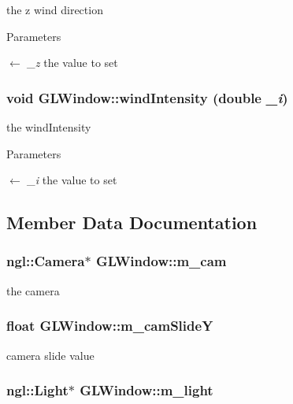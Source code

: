 the z wind direction 
\begin{DoxyParams}{Parameters}
\item[\mbox{$\leftarrow$} {\em \_\-z}]the value to set \end{DoxyParams}
\hypertarget{classGLWindow_a6863e8f482390cdef48a9eaceb7d9bd3}{
\subsubsection[{windIntensity}]{\setlength{\rightskip}{0pt plus 5cm}void GLWindow::windIntensity (double {\em \_\-i})}}
\label{classGLWindow_a6863e8f482390cdef48a9eaceb7d9bd3}


the windIntensity 
\begin{DoxyParams}{Parameters}
\item[\mbox{$\leftarrow$} {\em \_\-i}]the value to set \end{DoxyParams}


\subsection{Member Data Documentation}
\hypertarget{classGLWindow_a55556dafb4fc86c35b270ca0d68f456e}{
\subsubsection[{m\_\-cam}]{\setlength{\rightskip}{0pt plus 5cm}ngl::Camera$\ast$ {\bf GLWindow::m\_\-cam}}}
\label{classGLWindow_a55556dafb4fc86c35b270ca0d68f456e}


the camera \hypertarget{classGLWindow_a74663d07ad7560d68159c76ce5b750b1}{
\subsubsection[{m\_\-camSlideY}]{\setlength{\rightskip}{0pt plus 5cm}float {\bf GLWindow::m\_\-camSlideY}}}
\label{classGLWindow_a74663d07ad7560d68159c76ce5b750b1}


camera slide value \hypertarget{classGLWindow_a45cb8c5f6e0004c2cce30eb1d5b3c56f}{
\subsubsection[{m\_\-light}]{\setlength{\rightskip}{0pt plus 5cm}ngl::Light$\ast$ {\bf GLWindow::m\_\-light}}}
\label{classGLWindow_a45cb8c5f6e0004c2cce30eb1d5b3c56f}


